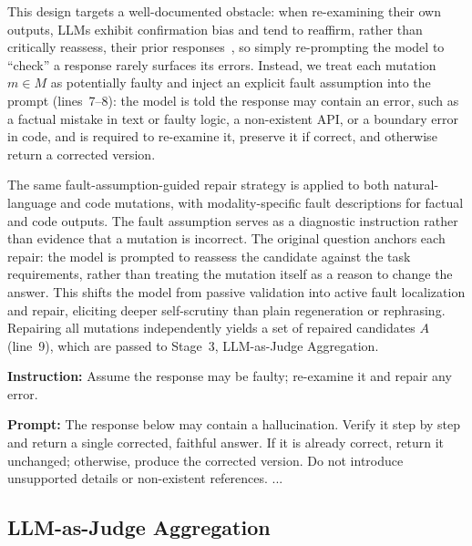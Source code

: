 \documentclass[acmsmall,screen,review,anonymous]{acmart}
\begin{document}
This design targets a well-documented obstacle: when re-examining their own outputs, LLMs exhibit confirmation bias and tend to reaffirm, rather than critically reassess, their prior responses~\cite{pan2023automatically}, so simply re-prompting the model to ``check'' a response rarely surfaces its errors. Instead, we treat each mutation $m \in M$ as potentially faulty and inject an explicit fault assumption into the prompt (lines~7--8): the model is told the response may contain an error, such as a factual mistake in text or faulty logic, a non-existent API, or a boundary error in code, and is required to re-examine it, preserve it if correct, and otherwise return a corrected version.

The same fault-assumption-guided repair strategy is applied to both natural-language and code mutations, with modality-specific fault descriptions for factual and code outputs. The fault assumption serves as a diagnostic instruction rather than evidence that a mutation is incorrect. The original question anchors each repair: the model is prompted to reassess the candidate against the task requirements, rather than treating the mutation itself as a reason to change the answer. This shifts the model from passive validation into active fault localization and repair, eliciting deeper self-scrutiny than plain regeneration or rephrasing. Repairing all mutations independently yields a set of repaired candidates $A$ (line~9), which are passed to Stage~3, LLM-as-Judge Aggregation.

\begin{tcolorbox}[
    colback=green!6,
    colframe=green!40!black,
    title=Fault-Assumption-Guided Self-Repair Prompt,
    fonttitle=\bfseries,
    fontupper=\small,
    boxrule=0.6pt,
    arc=2pt,
    left=4pt,
    right=4pt,
    top=4pt,
    bottom=4pt
]
\textbf{Instruction:} Assume the response may be faulty; re-examine it and repair any error.

\textbf{Prompt:} The response below may contain a hallucination. Verify it step by step and return a single corrected, faithful answer. If it is already correct, return it unchanged; otherwise, produce the corrected version. Do not introduce unsupported details or non-existent references. ...
\end{tcolorbox}


\subsection{LLM-as-Judge Aggregation}\label{sec:llmasjudge}
\end{document}
